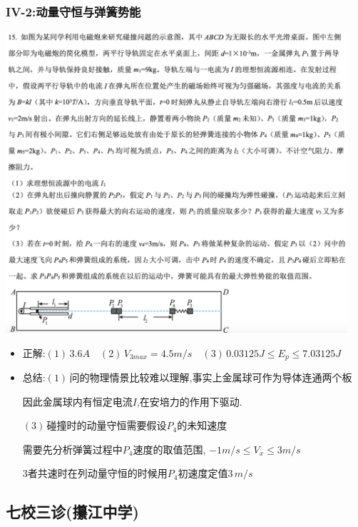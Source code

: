 \documentclass{article}
\begin{document}
\subsubsection{IV-2:动量守恒与弹簧势能}
\includegraphics[width=0.95\textwidth,keepaspectratio]{./pictures/3.10-3.png}

\begin{itemize}
    \item 正解:\quad $(1) \, 3.6A \quad (2) \, V_{3max} = 4.5 m/s \quad (3) \, 0.03125 J \leq E_{p} \leq 7.03125 J $
    \item 总结:\quad $(1) \,$问的物理情景比较难以理解,事实上金属球可作为导体连通两个板

          \hspace{3.2em}因此金属球内有恒定电流$I$,在安培力的作用下驱动.

          \hspace{3.2em}$(3) \,$碰撞时的动量守恒需要假设$P_{4}$的未知速度

          \hspace{3.2em}需要先分析弹簧过程中$P_{4}$速度的取值范围, $-1m/s \leq V_{x} \leq 3 m/s$

          \hspace{3.2em}$3$者共速时在列动量守恒的时候用$P_{4}$初速度定值$3 \, m/s$
\end{itemize}

\vspace{2em}

\subsection{七校三诊(攥江中学)}
\end{document}
